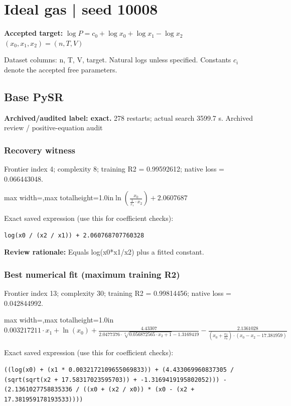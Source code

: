 \documentclass[10pt,letterpaper,landscape]{article}
\begin{document}
\section*{Ideal gas | seed 10008}
\textbf{Accepted target:} $\displaystyle \log P=c_0+\log x_0+\log x_1-\log x_2$\hfill $(x_0,x_1,x_2)=(n,T,V)$\par
{\small Dataset columns: n, T, V, target. Natural logs unless specified. Constants $c_i$ denote the accepted free parameters.}\par\medskip
\begin{minipage}[t]{0.485\textwidth}
\subsection*{Base PySR}
\textbf{Archived/audited label: exact.} 278 restarts; actual search 3599.7 s.
{\small Archived review / positive-equation audit}
\subsubsection*{Recovery witness}
Frontier index 4; complexity 8; training R2 = 0.99592612; native loss = 0.066443048.
\begin{center}\begin{adjustbox}{max width=\linewidth,max totalheight=1.0in}$\displaystyle \ln{\left(\frac{x_{0}}{\frac{1}{x_{1}} \cdot x_{2}} \right)} + 2.0607687$\end{adjustbox}\end{center}
{\scriptsize Exact saved expression (use this for coefficient checks):}
\begin{lstlisting}
log(x0 / (x2 / x1)) + 2.060768707760328
\end{lstlisting}
{\small\textbf{Review rationale:} Equals log(x0*x1/x2) plus a fitted constant.}
\subsubsection*{Best numerical fit (maximum training R2)}
Frontier index 13; complexity 30; training R2 = 0.99814456; native loss = 0.042844992.
\begin{center}\begin{adjustbox}{max width=\linewidth,max totalheight=1.0in}$\displaystyle 0.003217211 \cdot x_{1} + \ln{\left(x_{0} \right)} + \frac{4.43307}{2.0477376 \cdot \sqrt[4]{0.056872565 \cdot x_{2} + 1} - 1.3169419} - \frac{2.1361028}{\left(x_{0} + \frac{x_{2}}{x_{0}}\right) \cdot \left(x_{0} - x_{2} - 17.381959\right)}$\end{adjustbox}\end{center}
{\scriptsize Exact saved expression (use this for coefficient checks):}
\begin{lstlisting}
((log(x0) + (x1 * 0.0032172109655069833)) + (4.433069960837305 / (sqrt(sqrt(x2 + 17.58317023595703)) + -1.3169419195802052))) - (2.1361027758835336 / ((x0 + (x2 / x0)) * (x0 - (x2 + 17.381959178193533))))
\end{lstlisting}
\end{minipage}\hfill
\end{document}

